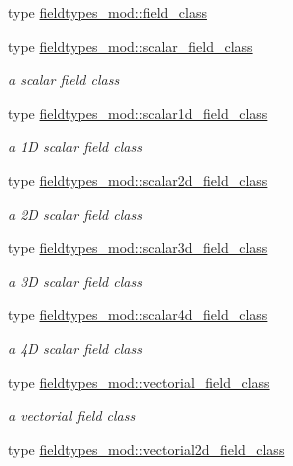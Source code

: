\begin{DoxyCompactItemize}
\item 
type \mbox{\hyperlink{structfieldtypes__mod_1_1field__class}{fieldtypes\+\_\+mod\+::field\+\_\+class}}
\item 
type \mbox{\hyperlink{structfieldtypes__mod_1_1scalar__field__class}{fieldtypes\+\_\+mod\+::scalar\+\_\+field\+\_\+class}}
\begin{DoxyCompactList}\small\item\em a scalar field class \end{DoxyCompactList}\item 
type \mbox{\hyperlink{structfieldtypes__mod_1_1scalar1d__field__class}{fieldtypes\+\_\+mod\+::scalar1d\+\_\+field\+\_\+class}}
\begin{DoxyCompactList}\small\item\em a 1D scalar field class \end{DoxyCompactList}\item 
type \mbox{\hyperlink{structfieldtypes__mod_1_1scalar2d__field__class}{fieldtypes\+\_\+mod\+::scalar2d\+\_\+field\+\_\+class}}
\begin{DoxyCompactList}\small\item\em a 2D scalar field class \end{DoxyCompactList}\item 
type \mbox{\hyperlink{structfieldtypes__mod_1_1scalar3d__field__class}{fieldtypes\+\_\+mod\+::scalar3d\+\_\+field\+\_\+class}}
\begin{DoxyCompactList}\small\item\em a 3D scalar field class \end{DoxyCompactList}\item 
type \mbox{\hyperlink{structfieldtypes__mod_1_1scalar4d__field__class}{fieldtypes\+\_\+mod\+::scalar4d\+\_\+field\+\_\+class}}
\begin{DoxyCompactList}\small\item\em a 4D scalar field class \end{DoxyCompactList}\item 
type \mbox{\hyperlink{structfieldtypes__mod_1_1vectorial__field__class}{fieldtypes\+\_\+mod\+::vectorial\+\_\+field\+\_\+class}}
\begin{DoxyCompactList}\small\item\em a vectorial field class \end{DoxyCompactList}\item 
type \mbox{\hyperlink{structfieldtypes__mod_1_1vectorial2d__field__class}{fieldtypes\+\_\+mod\+::vectorial2d\+\_\+field\+\_\+class}}

\end{DoxyCompactItemize}
